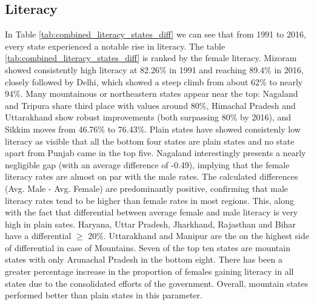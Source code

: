 \subsection{Literacy}
In Table \ref{tab:combined_literacy_states_diff} we can see that from 1991 to 2016, every state experienced a notable rise in literacy. The table \ref{tab:combined_literacy_states_diff} is ranked by the female literacy. Mizoram showed consistently high literacy at 82.26\% in 1991 and reaching 89.4\% in 2016, closely followed by Delhi, which showed a steep climb from about 62\% to nearly 94\%. Many mountainous or northeastern states appear near the top: Nagaland and Tripura share third place with values around 80\%, Himachal Pradesh and Uttarakhand show robust improvements (both surpassing 80\% by 2016), and Sikkim moves from 46.76\% to 76.43\%. Plain states have showed consistenly low literacy as visible that all the bottom four states are plain states and no state apart from Punjab came in the top five. Nagaland interestingly presents a nearly negligible gap (with an average difference of -0.49), implying that the female literacy rates are almost on par with the male rates. The calculated differences (Avg. Male - Avg. Female) are predominantly positive, confirming that male literacy rates tend to be higher than female rates in most regions.  This, along with  the fact that differential between average female and male literacy is very high in plain sates. Haryana, Uttar Pradesh, Jharkhand, Rajasthan and Bihar have a differential $\geq$ 20\%. Uttarakhand and Manipur are the on the highest side of differential in case of Mountains. Seven of the top ten states are mountain states with only Arunachal Pradesh in the bottom eight.  There has been a greater percentage increase in the proportion of females gaining literacy in all states due to the consolidated efforts of the government. Overall, mountain states performed better than plain states in this parameter.
